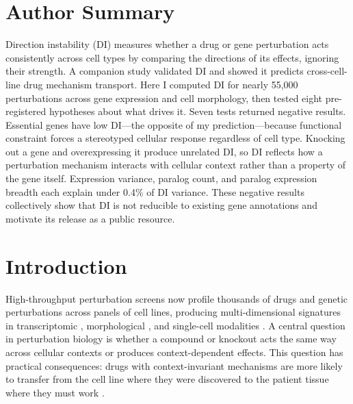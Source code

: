 \documentclass[11pt]{article}
\begin{document}
\section*{Author Summary}
Direction instability (DI) measures whether a drug or gene perturbation
acts consistently across cell types by comparing the directions of its
effects, ignoring their strength.  A companion study validated DI and
showed it predicts cross-cell-line drug mechanism transport.  Here I
computed DI for nearly 55{,}000 perturbations across gene expression
and cell morphology, then tested eight pre-registered hypotheses about
what drives it.  Seven tests returned negative results.  Essential genes
have low DI---the opposite of my prediction---because functional
constraint forces a stereotyped cellular response regardless of cell
type.  Knocking out a gene and overexpressing it produce unrelated DI,
so DI reflects how a perturbation mechanism interacts with cellular
context rather than a property of the gene itself.  Expression variance,
paralog count, and paralog expression breadth each explain under 0.4\%
of DI variance.  These negative results collectively show that DI is
not reducible to existing gene annotations and motivate its release as a
public resource.


\section{Introduction}

High-throughput perturbation screens now profile thousands of drugs and
genetic perturbations across panels of cell lines, producing
multi-dimensional signatures in transcriptomic
\citep{subramanian2017next}, morphological \citep{bray2016cell}, and
single-cell modalities \citep{tahoe2025}.  A central question in
perturbation biology is whether a compound or knockout acts the same way
across cellular contexts or produces context-dependent effects.  This
question has practical consequences: drugs with context-invariant
mechanisms are more likely to transfer from the cell line where they were
discovered to the patient tissue where they must work
\citep{tower2026confound}.
\end{document}
